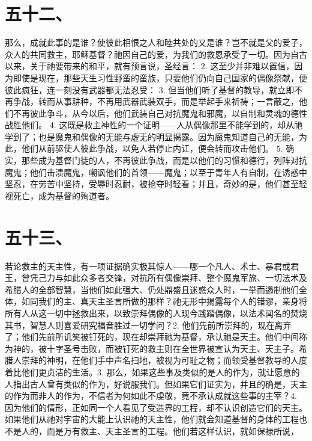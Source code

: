 
\section{五十二、}

那么，成就此事的是谁？使彼此相恨之人和睦共处的又是谁？岂不就是父的爱子，众人的共同救主，耶稣基督？祂因自己的爱，为我们的救恩承受了一切。因为自古以来，关于祂要带来的和平，就有预言说，圣经言： 2. 这至少并非难以置信，因为即使是现在，那些天生习性野蛮的蛮族，只要他们仍向自己国家的偶像祭献，便彼此疯狂，连一刻没有武器都无法忍受： 3. 但当他们听了基督的教导，就立即不再争战，转而从事耕种，不再用武器武装双手，而是举起手来祈祷；一言蔽之，他们不再彼此争斗，从今以后，他们武装自己对抗魔鬼和邪魔，以自制和灵魂的德性战胜他们。 4. 这既是救主神性的一个证明——人从偶像那里不能学到的，却从祂学到了；也是魔鬼和偶像的无能与虚无的明显揭露。因为魔鬼知道自己的无能，为此，他们从前驱使人彼此争战，以免人若停止内讧，便会转而攻击他们。 5. 确实，那些成为基督门徒的人，不再彼此争战，而是以他们的习惯和德行，列阵对抗魔鬼；他们击溃魔鬼，嘲讽他们的首领——魔鬼；以至于青年人有自制，在诱惑中坚忍，在劳苦中坚持，受辱时忍耐，被抢夺时轻看；并且，奇妙的是，他们甚至轻视死亡，成为基督的殉道者。\par


\section{五十三、}

若论救主的天主性，有一项证据确实极其惊人——哪一个凡人、术士、暴君或君王，曾凭己力与如此众多者交锋，对抗所有偶像崇拜、整个魔鬼军旅、一切法术及希腊人的全部智慧，当他们如此强大、仍处鼎盛且迷惑众人时，一举而遏制他们全体，如同我们的主、真天主圣言所做的那样？祂无形中揭露每个人的错谬，亲身将所有人从这一切中拯救出来，以致崇拜偶像的人现今践踏偶像，以法术闻名的焚烧其书，智慧人则喜爱研究福音胜过一切学问？\newline{}2. 他们先前所崇拜的，现在离弃了；他们先前所讥笑被钉死的，现在却崇拜祂为基督，承认祂是天主。他们中间称为神的，被十字圣号击败，而被钉死的救主则在全世界被宣认为天主、天主子。希腊人崇拜的神明，在他们手中声名扫地，被视为可耻之物；而领受基督教导的人度着比他们更贞洁的生活。\newline{}3. 那么，如果这些事及类似的是人的作为，就让愿意的人指出古人曾有类似的作为，好说服我们。但如果它们证实为，并且的确是，天主的作为而非人的作为，不信者为何如此不虔敬，竟不承认成就这些事的主宰？\newline{}4. 因为他们的情形，正如同一个人看见了受造界的工程，却不认识创造它们的天主。如果他们从祂对宇宙的大能上认识祂的天主性，他们就会知道基督的身体的工程也不是人的，而是万有救主、天主圣言的工程。他们若这样认识，就如保禄所说，\par

